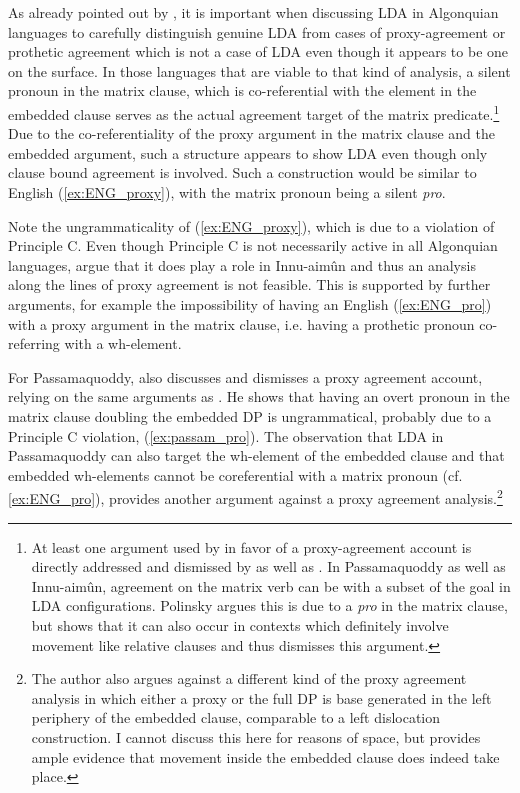 \documentclass[output=paper
,modfonts
,nonflat]{langsci/langscibook}
\begin{document}
As already pointed out by \citet{Polinsky2003}, it is important when discussing LDA in Algonquian languages to carefully distinguish genuine LDA from cases of proxy-agreement or prothetic agreement which is not a case of LDA even though it appears to be one on the surface. In those languages that are viable to that kind of analysis, a silent pronoun in the matrix clause, which is co-referential with the element in the embedded clause serves as the actual agreement target of the matrix predicate.\footnote{At least one argument used by \citet{Polinsky2003} in favor of a proxy-agreement account is directly addressed and dismissed by \citet{Bruening2001a} as well as \citet{Branigan_MacKenzie2002}. In Passamaquoddy as well as Innu-aim\^{u}n, agreement on the matrix verb can be with a subset of the goal in LDA configurations. Polinsky argues this is due to a \textit{pro} in the matrix clause, but \citet[][269]{Bruening2001a} shows that it can also occur in contexts which definitely involve movement like relative clauses and thus dismisses this argument.} Due to the co-referentiality of the proxy argument in the matrix clause and the embedded argument, such a structure appears to show LDA even though only clause bound agreement is involved. Such a construction would be similar to English (\ref{ex:ENG_proxy}), with the matrix pronoun being a silent \textit{pro}.
\begin{exe}
\end{exe}
Note the ungrammaticality of (\ref{ex:ENG_proxy}), which is due to a violation of Principle C. Even though Principle C is not necessarily active in all Algonquian languages, \citet{Branigan_MacKenzie2002} argue that it does play a role in Innu-aim\^{u}n and thus an analysis along the lines of proxy agreement is not feasible. This is supported by further arguments, for example the impossibility of having an English (\ref{ex:ENG_pro}) with a proxy argument in the matrix clause, i.e. having a prothetic pronoun co-referring with a wh-element.
\begin{exe}
\end{exe}
For Passamaquoddy, \citet{Bruening2001a} also discusses and dismisses a proxy agreement account, relying on the same arguments as \citet{Branigan_MacKenzie2002}. He shows that having an overt pronoun in the matrix clause doubling the embedded DP is ungrammatical, probably due to a Principle C violation, (\ref{ex:passam_pro}). The observation that LDA in Passamaquoddy can also target the wh-element of the embedded clause and that embedded wh-elements cannot be coreferential with a matrix pronoun (cf. \ref{ex:ENG_pro}), provides another argument against a proxy agreement analysis.\footnote{The author also argues against a different kind of the proxy agreement analysis in which either a proxy or the full DP is base generated in the left periphery of the embedded clause, comparable to a left dislocation construction. I cannot discuss this here for reasons of space, but  \citet[][263ff]{Bruening2001a} provides ample evidence that movement inside the embedded clause does indeed take place.}
\end{document}

